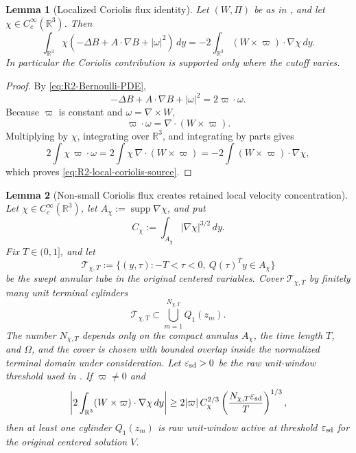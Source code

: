 \documentclass[11pt]{amsart}
\numberwithin{equation}{section}
\theoremstyle{plain}
\newtheorem{lemma}[lemma]{Lemma}
\theoremstyle{definition}
\theoremstyle{remark}
\newcommand{\eps}{\varepsilon}
\begin{document}
\begin{lemma}[Localized Coriolis flux identity]
\label{lem:R2-coriolis-flux-localization}
Let \((W,\Pi)\) be as in , and let
\(\chi\in C_c^\infty(\mathbb R^3)\).  Then
\begin{equation}\label{eq:R2-local-coriolis-source}
   \int_{\mathbb R^3}\chi
   \left(
      -\Delta B+A\cdot\nabla B+|\omega|^2
   \right)\,dy
   =
   -2\int_{\mathbb R^3}(W\times\varpi)\cdot\nabla\chi\,dy .
\end{equation}
In particular the Coriolis contribution is supported only where the cutoff
varies.
\end{lemma}

\begin{proof}
By \eqref{eq:R2-Bernoulli-PDE},
\[
   -\Delta B+A\cdot\nabla B+|\omega|^2=2\varpi\cdot\omega .
\]
Because \(\varpi\) is constant and \(\omega=\nabla\times W\),
\[
   \varpi\cdot\omega
   =
   \nabla\cdot(W\times\varpi).
\]
Multiplying by \(\chi\), integrating over \(\mathbb R^3\), and integrating by
parts gives
\[
   2\int\chi\,\varpi\cdot\omega
   =
   2\int\chi\,\nabla\cdot(W\times\varpi)
   =
   -2\int(W\times\varpi)\cdot\nabla\chi ,
\]
which proves \eqref{eq:R2-local-coriolis-source}.
\end{proof}

\begin{lemma}[Non-small Coriolis flux creates retained local velocity concentration]
\label{lem:R2-annular-flux-active-concentration}
Let \(\chi\in C_c^\infty(\mathbb R^3)\), let
\(A_\chi:=\operatorname{supp}\nabla\chi\), and put
\[
   C_\chi:=\int_{A_\chi}|\nabla\chi|^{3/2}\,dy .
\]
Fix \(T\in(0,1]\), and let
\[
   \mathcal T_{\chi,T}
   :=
   \{(y,\tau): -T<\tau<0,\ Q(\tau)^Ty\in A_\chi\}
\]
be the swept annular tube in the original centered variables.  Cover
\(\mathcal T_{\chi,T}\) by finitely many unit terminal cylinders
\[
   \mathcal T_{\chi,T}\subset \bigcup_{m=1}^{N_{\chi,T}}Q_1(z_m).
\]
The number \(N_{\chi,T}\) depends only on the compact annulus
\(A_\chi\), the time length \(T\), and \(\Omega\), and the cover is chosen with
bounded overlap inside the normalized terminal domain under consideration.
Let \(\eps_{\rm sd}>0\) be the raw unit-window threshold used in
.  If \(\varpi\ne0\) and
\begin{equation}\label{eq:R2-flux-active-threshold}
   \left|
      2\int_{\mathbb R^3}(W\times\varpi)\cdot\nabla\chi\,dy
   \right|
   \ge
   2|\varpi|\,C_\chi^{2/3}
      \left(\frac{N_{\chi,T}\eps_{\rm sd}}{T}\right)^{1/3},
\end{equation}
then at least one cylinder \(Q_1(z_m)\) is raw unit-window active at threshold
\(\eps_{\rm sd}\) for the original centered solution \(V\).
\end{lemma}
\end{document}
